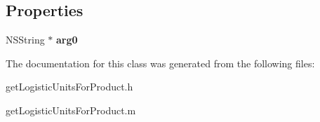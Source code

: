 \subsection*{Properties}
\begin{DoxyCompactItemize}
\item 
\hypertarget{interfaceget_logistic_units_for_product_a27e726a01821f21d65f57b4eb0539200}{}N\+S\+String $\ast$ {\bfseries arg0}\label{interfaceget_logistic_units_for_product_a27e726a01821f21d65f57b4eb0539200}

\end{DoxyCompactItemize}


The documentation for this class was generated from the following files\+:\begin{DoxyCompactItemize}
\item 
get\+Logistic\+Units\+For\+Product.\+h\item 
get\+Logistic\+Units\+For\+Product.\+m\end{DoxyCompactItemize}
